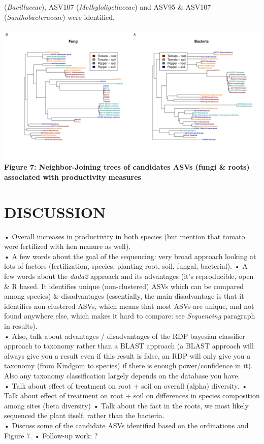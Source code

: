 \documentclass[11pt,]{article}
\begin{document}
(\emph{Bacillaceae}), ASV107 (\emph{Methyloligellaceae}) and ASV95 \&
ASV107 (\emph{Santhobacteraceae}) were identified. ~\\
\hspace*{0.333em}\\
\includegraphics{../figures/Figure7_candidateASVs.pdf}\\
\textbf{Figure 7: Neighbor-Joining trees of candidates ASVs (fungi \&
roots) associated with productivity measures} ~\\
\hspace*{0.333em}

\newpage  

\section{DISCUSSION}\label{discussion}

• Overall increases in productivity in both species (but mention that
tomato were fertilized with hen manure as well).\\
• A few words about the goal of the sequencing: very broad approach
looking at lots of factors (fertilization, species, planting root, soil,
fungal, bacterial). • A few words about the \emph{dada2} approach and
its advantages (it's reproducible, open \& R based. It identifies unique
(non-clustered) ASVs which can be compared among species) \&
disadvantages (essentially, the main disadvantage is that it identifies
non-clustered ASVs, which means that most ASVs are unique, and not found
anywhere else, which makes it hard to compare: see \emph{Sequencing}
paragraph in results).\\
• Also, talk about advantages / disadvantages of the RDP bayesian
classifier approach to taxonomy rather than a BLAST approach (a BLAST
approach will always give you a result even if this result is false, an
RDP will only give you a taxonomy (from Kindgom to species) if there is
enough power/confidence in it). Also any taxonomy classification largely
depends on the database you have.\\
• Talk about effect of treatment on root + soil on overall (alpha)
diversity. • Talk about effect of treatment on root + soil on
differences in species composition among sites (beta diversity) • Talk
about the fact in the roots, we most likely sequenced the plant itself,
rather than the bacteria.\\
• Discuss some of the candidate ASVs identified based on the ordinations
and Figure 7. • Follow-up work: ?
\end{document}

